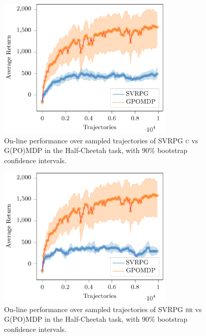 \begin{figure}[h]
	\begin{minipage}[h]{1\textwidth}
		\centering
		\includegraphics[width=0.75\textwidth]{Images/Experiments/half_cheetah_GPOMDP_vs_NonSelf_SVRPG_C.pdf}
		\vspace{-0.1in}
		\caption{On-line performance over sampled trajectories of \acs{SVRPG} \textsc{c} vs G(PO)MDP in the Half-Cheetah task, with 90\% bootstrap confidence intervals.}
		\label{fig:hcfour}
	\end{minipage}
	\vspace{-0.15in}
\end{figure}

\begin{figure}[h]
	\begin{minipage}[h]{1\textwidth}
		\centering
		\includegraphics[width=0.75\textwidth]{Images/Experiments/half_cheetah_GPOMDP_vs_SVRPG_B_reuse.pdf}
		\vspace{-0.1in}
		\caption{On-line performance over sampled trajectories of \acs{SVRPG} \textsc{br} vs G(PO)MDP in the Half-Cheetah task, with 90\% bootstrap confidence intervals.}
		\label{fig:hcnine}
	\end{minipage}
	\vspace{-0.15in}
\end{figure}

